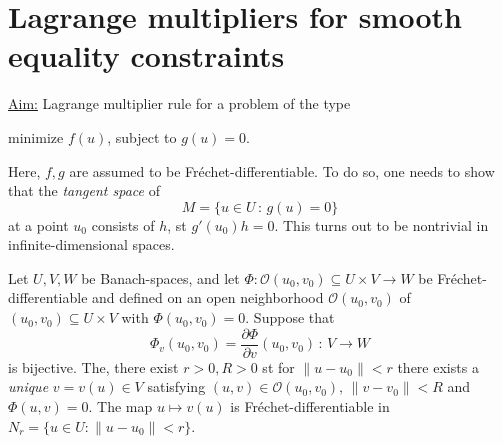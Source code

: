 \documentclass[../skript.tex]{subfiles}
\begin{document}
\section{Lagrange multipliers for smooth equality constraints}\label{sec:c1e3}
\underline{Aim:} Lagrange multiplier rule for a problem of the type
\begin{problemnonumb}
	minimize $f(u)$, subject to $g(u) = 0$.
\end{problemnonumb}
Here, $f,g$ are assumed to be Fréchet-differentiable. To do so, one needs to show that the \emph{tangent space} of
\[
	M=\{u\in U\,:\,g(u)=0\}
\]
at a point $u_0$ consists of $h$, \ac{st} $g'(u_0)h = 0$. This turns out to be nontrivial in infinite-dimensional spaces.
\begin{theorem}\label{thm:c1e26}
	Let $U,V,W$ be Banach-spaces, and let $\Phi:\mathcal{O}(u_0,v_0)\subseteq U\times V\to W$ %
	be Fréchet-differentiable and defined on an open neighborhood $\mathcal{O}(u_0,v_0)$ of $(u_0,v_0)\subseteq U\times V$ with $\Phi(u_0,v_0) = 0$.
	Suppose that 
	\[
		\Phi_v(u_0,v_0)=\frac{\partial\Phi}{\partial v}(u_0,v_0)\,:\,V\to W
	\]
	is bijective. The, there exist $r>0, R>0$ \ac{st} for $\|u-u_0\|<r$ there exists a \emph{unique} $v=v(u)\in V$ satisfying $(u,v)\in\mathcal{O}(u_0,v_0),\,\|v-v_0\|<R$ and $\Phi(u,v) = 0$. The map $u\mapsto v(u)$ is Fréchet-differentiable in $N_r=\{u\in U:\|u-u_0\|<r\}$. 
\end{theorem}
\end{document}
